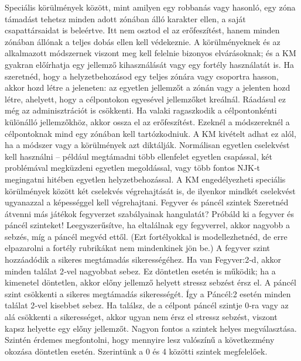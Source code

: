 \documentclass[oneside]{book}
\begin{document}
Speciális körülmények között, mint amilyen egy robbanás vagy hasonló, egy zóna támadást tehetsz minden adott zónában álló karakter ellen, a saját csapattársaidat is beleértve. Itt nem osztod el az erőfeszítést, hanem minden zónában állónak a teljes dobás ellen kell védekeznie. A körülményeknek és az alkalmazott módszernek viszont meg kell felelnie bizonyos elvárásoknak; és a KM gyakran előírhatja egy jellemző kihasználását vagy egy fortély használatát is.
Ha szeretnéd, hogy a helyzetbehozásod egy teljes zónára vagy csoportra hasson, akkor hozd létre a jeleneten: az egyetlen jellemzőt a zónán vagy a jelenten hozd létre, ahelyett, hogy a célpontokon egyesével jellemzőket kreálnál. Ráadásul ez még az adminisztrációt is csökkenti. Ha valaki ragaszkodik a célpontonkénti különálló jellemzőkhöz, akkor ossza el az erőfeszítést.
Ezeknél a módszereknél a célpontoknak mind egy zónában kell tartózkodniuk. A KM kivételt adhat ez alól, ha a módszer vagy a körülmények azt diktálják.
Normálisan egyetlen cselekvést kell használni – például megtámadni több ellenfelet egyetlen csapással, két problémával megküzdeni egyetlen megoldással, vagy több fontos NJK‑t megingatni hitében egyetlen helyzetbehozással. A KM engedélyezheti speciális körülmények között két cselekvés végrehajtását is, de ilyenkor mindkét cselekvést ugyanazzal a képességgel kell végrehajtani.
Fegyver és páncél szintek
Szeretnéd átvenni más játékok fegyverzet szabályainak hangulatát? Próbáld ki a fegyver és páncél szinteket! Leegyszerűsítve, ha eltalálnak egy fegyverrel, akkor nagyobb a sebzés, míg a páncél megvéd ettől. (Ezt fortélyokkal is modellezhetnéd, de erre elpazarolni a fortély rubrikákat nem mindenkinek jön be.)
A fegyver szint hozzáadódik a sikeres megtámadás sikerességéhez. Ha van Fegyver:2‑d, akkor minden találat 2‑vel nagyobbat sebez. Ez döntetlen esetén is működik; ha a kimenetel döntetlen, akkor előny jellemző helyett stressz sebzést érsz el.
A páncél szint csökkenti a sikeres megtámadás sikerességét. Így a Páncél:2 esetén minden találat 2‑vel kisebbet sebez. Ha találsz, de a célpont páncél szintje 0‑ra vagy az alá csökkenti a sikerességet, akkor ugyan nem érsz el stressz sebzést, viszont kapsz helyette egy előny jellemzőt.
Nagyon fontos a szintek helyes megválasztása. Szintén érdemes megfontolni, hogy mennyire lesz valószínű a következmény okozása döntetlen esetén. Szerintünk a 0 és 4 közötti szintek megfelelőek.
\end{document}
